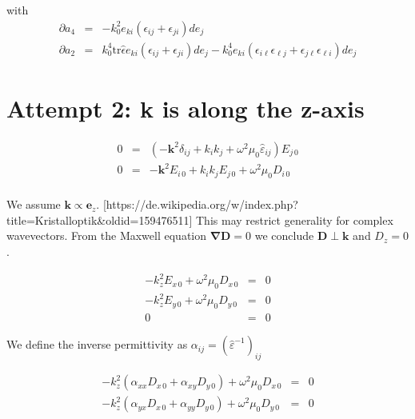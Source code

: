 \documentclass[12pt,a4paper,twoside,openright,BCOR10mm,headsepline,titlepage,abstracton,chapterprefix,final]{scrreprt}
\newcommand\Vector[1]{{\mathbf{#1}}}
\newcommand\wavenumber{k}
\newcommand\Wavevector{\Vector{\wavenumber}}
\newcommand\Nabla{\Vector{\nabla}}
\newcommand\Tensor[1]{\hat{#1}}
\newcommand\scalarDfield{D}
\newcommand\Dfield{\Vector{\scalarDfield}}
\newcommand\permittivity{\Tensor{\scalarpermittivity}}
\newcommand\scalarrelativepermittivity{\epsilon}
\newcommand\relativepermittivity{\Tensor{\scalarrelativepermittivity}}
\newcommand\scalarpermittivity{\varepsilon}
\begin{document}
with
\begin{eqnarray}
 \partial a_4 &=& - k_0^2  e_{ki} ( \scalarrelativepermittivity_{ij} + \scalarrelativepermittivity_{ji} ) de_{j} \\
 \partial a_2 &=&    k_0^4 \text{tr} \relativepermittivity e_{ki} ( \scalarrelativepermittivity_{ij} + \scalarrelativepermittivity_{ji} ) de_{j} - k_0^4 e_{ki} ( \scalarrelativepermittivity_{i\ell} \scalarrelativepermittivity_{\ell j} + \scalarrelativepermittivity_{j\ell} \scalarrelativepermittivity_{\ell i} ) de_j
\end{eqnarray}



\section{Attempt 2: k is along the z-axis}

\begin{eqnarray}
 0 &=& \left(-\Vector{k}^2 \delta_{ij} + k_i k_j + \omega^2 \mu_0 \permittivity_{ij} \right) E_{j\,0} \\
 0 &=& -\Vector{k}^2 E_{i\,0} + k_i k_j E_{j\,0} + \omega^2 \mu_0 D_{i\,0} \\
\end{eqnarray}

We assume $\Wavevector \propto \Vector{e}_z$. [https://de.wikipedia.org/w/index.php?title=Kristalloptik\&oldid=159476511]
This may restrict generality for complex wavevectors.
From the Maxwell equation $\Nabla \Dfield = 0$ we conclude $\Dfield \perp \Wavevector$ and $\scalarDfield_z=0$.

\begin{eqnarray}
 - \wavenumber_z^2 E_{x\,0} + \omega^2 \mu_0 \scalarDfield_{x\,0} &=& 0\\ 
 - \wavenumber_z^2 E_{y\,0} + \omega^2 \mu_0 \scalarDfield_{y\,0} &=& 0\\
 0 &=& 0
\end{eqnarray}

We define the inverse permittivity as $\alpha_{ij} = (\permittivity^{-1})_{ij}$

\begin{eqnarray}
 - \wavenumber_z^2 (\alpha_{xx} \scalarDfield_{x\,0} + \alpha_{xy} \scalarDfield_{y\,0}) + \omega^2 \mu_0 \scalarDfield_{x\,0} &=& 0\\ 
 - \wavenumber_z^2 (\alpha_{yx} \scalarDfield_{x\,0} + \alpha_{yy} \scalarDfield_{y\,0}) + \omega^2 \mu_0 \scalarDfield_{y\,0} &=& 0
\end{eqnarray}
\end{document}
